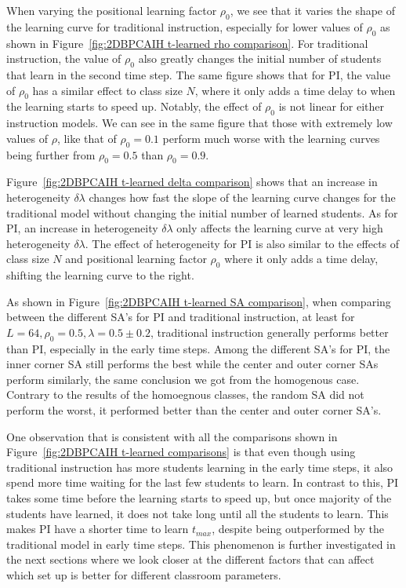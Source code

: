 When varying the positional learning factor $\rho_0$, we see that it varies the shape of the learning curve for traditional instruction, especially for lower values of $\rho_0$ as shown in Figure~\ref{fig:2DBPCAIH t-learned rho comparison}. 
For traditional instruction, the value of $\rho_0$ also greatly changes the initial number of students that learn in the second time step.
The same figure shows that for PI, the value of $\rho_0$ has a similar effect to class size $N$, where it only adds a time delay to when the learning starts to speed up.
Notably, the effect of $\rho_0$ is not linear for either instruction models.
We can see in the same figure that those with extremely low values of $\rho$, like that of $\rho_0=0.1$ perform much worse with the learning curves being further from $\rho_0=0.5$ than $\rho_0=0.9$.

Figure~\ref{fig:2DBPCAIH t-learned delta comparison} shows that an increase in heterogeneity $\delta\lambda$ changes how fast the slope of the learning curve changes for the traditional model without changing the initial number of learned students. 
As for PI, an increase in heterogeneity $\delta\lambda$ only affects the learning curve at very high heterogeneity $\delta\lambda$.
The effect of heterogeneity for PI is also similar to the effects of class size $N$ and positional learning factor $\rho_0$ where it only adds a time delay, shifting the learning curve to the right.

As shown in Figure~\ref{fig:2DBPCAIH t-learned SA comparison}, when comparing between the different SA's for PI and traditional instruction, at least for $L=64, \rho_0=0.5, \lambda=0.5\pm0.2$, traditional instruction generally performs better than PI, especially in the early time steps. 
Among the different SA's for PI, the inner corner SA still performs the best while the center and outer corner SAs perform similarly, the same conclusion we got from the homogenous case.
Contrary to the results of the homoegnous classes, the random SA did not perform the worst, it performed better than the center and outer corner SA's.

One observation that is consistent with all the comparisons shown in Figure~\ref{fig:2DBPCAIH t-learned comparisons} is that even though using traditional instruction has more students learning in the early time steps, it also spend more time waiting for the last few students to learn. 
In contrast to this, PI takes some time before the learning starts to speed up, but once majority of the students have learned, it does not take long until all the students to learn.
This makes PI have a shorter time to learn $t_{max}$, despite being outperformed by the traditional model in early time steps.
This phenomenon is further investigated in the next sections where we look closer at the different factors that can affect which set up is better for different classroom parameters.

